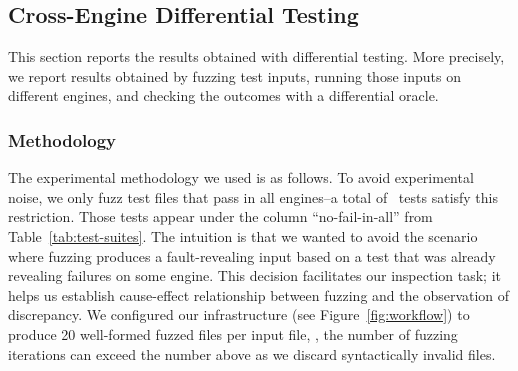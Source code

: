 \documentclass[10pt,conference,anonymous]{IEEEtran}
\begin{document}

\begin{center}
\end{center}


\subsection{Cross-Engine Differential Testing}
\label{sec:cross-engine-diff-testing-results}

This section reports the results obtained with differential
testing. More precisely, we report results obtained by fuzzing test
inputs, running those inputs on different engines, and checking the
outcomes with a differential oracle.

\vspace{0.5ex}
\subsubsection{Methodology}
The experimental methodology we used is as follows. To avoid
experimental noise, we only fuzz test files that pass in all
engines--a total of \totalTestFilesPassInAll\ tests satisfy this
restriction.  Those tests appear under the column ``no-fail-in-all''
from Table~\ref{tab:test-suites}.  The intuition is that we wanted to
avoid the scenario where fuzzing produces a fault-revealing input
based on a test that was already revealing failures on some
engine. This decision facilitates our inspection task; it helps us
establish cause-effect relationship between fuzzing and the
observation of discrepancy.  We configured our infrastructure (see
Figure~\ref{fig:workflow}) to produce 20 well-formed fuzzed files per
input file, \ie{}, the number of fuzzing iterations can exceed the
number above as we discard syntactically invalid files.
\end{document}
